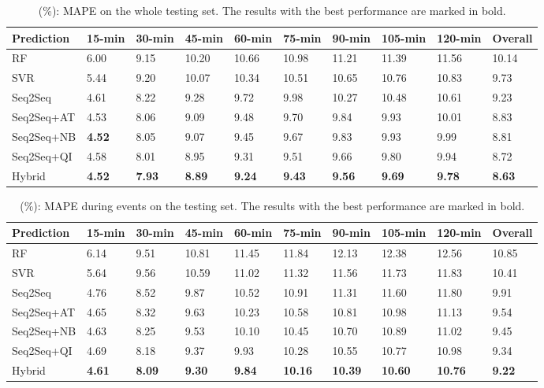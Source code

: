\begin{table*}
\caption{ (\%): MAPE on the whole testing set. The results with the best performance are marked in bold.}
\label{tab:cmpall}
\begin{tabular}{llllllllll}
\toprule
Prediction & 15-min & 30-min & 45-min & 60-min & 75-min & 90-min & 105-min & 120-min & Overall\\
\midrule
RF &  6.00 & 9.15 & 10.20 & 10.66 & 10.98 & 11.21 & 11.39 & 11.56 & 10.14 \\
SVR  &  5.44 & 9.20 & 10.07 & 10.34 & 10.51 & 10.65 & 10.76 & 10.83 & 9.73 \\
\midrule
Seq2Seq  & 4.61 & 8.22 & 9.28 & 9.72 & 9.98 & 10.27 & 10.48 & 10.61 & 9.23\\
Seq2Seq+AT    & 4.53 & 8.06 & 9.09 & 9.48 & 9.70 & 9.84 & 9.93 & 10.01 & 8.83\\
Seq2Seq+NB & \textbf{4.52} & 8.05 & 9.07 & 9.45 & 9.67 & 9.83 & 9.93 & 9.99 & 8.81\\
\midrule
Seq2Seq+QI   & 4.58 & 8.01 & 8.95 & 9.31 & 9.51 & 9.66 & 9.80 & 9.94 & 8.72\\
Hybrid & \textbf{4.52} & \textbf{7.93} & \textbf{8.89} & \textbf{9.24 }& \textbf{9.43} & \textbf{9.56} & \textbf{9.69} & \textbf{9.78} & \textbf{8.63}\\
\bottomrule
\end{tabular}
\end{table*}


\begin{table*}
\caption{ (\%): MAPE during events on the testing set. The results with the best performance are marked in bold.}
\label{tab:cmpevent}
\begin{tabular}{llllllllll}
\toprule
Prediction & 15-min & 30-min & 45-min & 60-min & 75-min & 90-min & 105-min & 120-min & Overall\\
\midrule
RF & 6.14 & 9.51 & 10.81 & 11.45 & 11.84 & 12.13 & 12.38 & 12.56 & 10.85 \\
SVR & 5.64 & 9.56 & 10.59 & 11.02 & 11.32 & 11.56 & 11.73 & 11.83 & 10.41 \\
\midrule
Seq2Seq         & 4.76 & 8.52 & 9.87 & 10.52 & 10.91 & 11.31 & 11.60 & 11.80 & 9.91\\
Seq2Seq+AT    & 4.65 & 8.32 & 9.63 & 10.23 & 10.58 & 10.81 & 10.98 & 11.13 & 9.54\\
Seq2Seq+NB & 4.63 & 8.25 & 9.53 & 10.10 & 10.45 & 10.70 & 10.89 & 11.02 & 9.45\\
\midrule
Seq2Seq+QI   & 4.69 & 8.18 & 9.37 & 9.93  & 10.28 & 10.55 & 10.77 & 10.98 & 9.34\\
Hybrid & \textbf{4.61} & \textbf{8.09} &\textbf{ 9.30} & \textbf{9.84} & \textbf{10.16} & \textbf{10.39} & \textbf{10.60} & \textbf{10.76} & \textbf{9.22}\\
\bottomrule
\end{tabular}
\end{table*}

